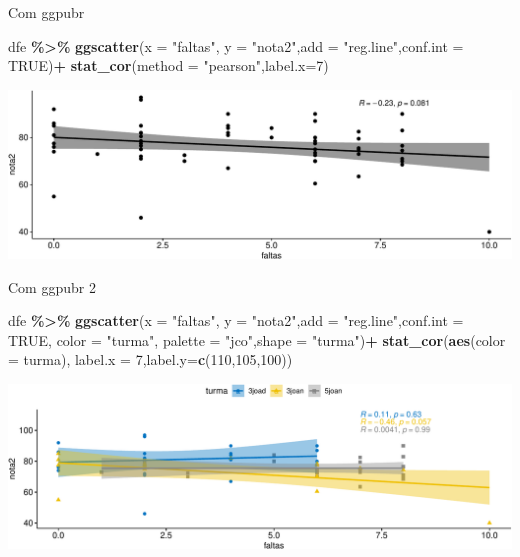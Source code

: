 \documentclass[
  9pt,
  ignorenonframetext,
  aspectratio=169]{beamer}
\newenvironment{Shaded}{\begin{snugshade}}{\end{snugshade}}
\newcommand{\DataTypeTok}[1]{\textcolor[rgb]{0.13,0.29,0.53}{#1}}
\newcommand{\DecValTok}[1]{\textcolor[rgb]{0.00,0.00,0.81}{#1}}
\newcommand{\KeywordTok}[1]{\textcolor[rgb]{0.13,0.29,0.53}{\textbf{#1}}}
\newcommand{\NormalTok}[1]{#1}
\newcommand{\OperatorTok}[1]{\textcolor[rgb]{0.81,0.36,0.00}{\textbf{#1}}}
\newcommand{\OtherTok}[1]{\textcolor[rgb]{0.56,0.35,0.01}{#1}}
\newcommand{\StringTok}[1]{\textcolor[rgb]{0.31,0.60,0.02}{#1}}
\begin{document}
\begin{frame}[fragile]{Com ggpubr}
\protect\hypertarget{com-ggpubr}{}
\begin{Shaded}
\begin{Highlighting}[]
\NormalTok{dfe }\OperatorTok{\%\textgreater{}\%}\StringTok{ }\KeywordTok{ggscatter}\NormalTok{(}\DataTypeTok{x =} \StringTok{"faltas"}\NormalTok{, }\DataTypeTok{y =} \StringTok{"nota2"}\NormalTok{,}\DataTypeTok{add =} \StringTok{"reg.line"}\NormalTok{,}\DataTypeTok{conf.int =} \OtherTok{TRUE}\NormalTok{)}\OperatorTok{+}
\StringTok{  }\KeywordTok{stat\_cor}\NormalTok{(}\DataTypeTok{method =} \StringTok{"pearson"}\NormalTok{,}\DataTypeTok{label.x=}\DecValTok{7}\NormalTok{)}
\end{Highlighting}
\end{Shaded}

\includegraphics{aula_11_files/figure-beamer/unnamed-chunk-33-1.pdf}
\end{frame}

\begin{frame}[fragile]{Com ggpubr 2}
\protect\hypertarget{com-ggpubr-2}{}
\begin{Shaded}
\begin{Highlighting}[]
\NormalTok{dfe }\OperatorTok{\%\textgreater{}\%}\StringTok{ }\KeywordTok{ggscatter}\NormalTok{(}\DataTypeTok{x =} \StringTok{"faltas"}\NormalTok{, }\DataTypeTok{y =} \StringTok{"nota2"}\NormalTok{,}\DataTypeTok{add =} \StringTok{"reg.line"}\NormalTok{,}\DataTypeTok{conf.int =} \OtherTok{TRUE}\NormalTok{,}
          \DataTypeTok{color =} \StringTok{"turma"}\NormalTok{, }\DataTypeTok{palette =} \StringTok{"jco"}\NormalTok{,}\DataTypeTok{shape =} \StringTok{"turma"}\NormalTok{)}\OperatorTok{+}
\StringTok{  }\KeywordTok{stat\_cor}\NormalTok{(}\KeywordTok{aes}\NormalTok{(}\DataTypeTok{color =}\NormalTok{ turma), }\DataTypeTok{label.x =} \DecValTok{7}\NormalTok{,}\DataTypeTok{label.y=}\KeywordTok{c}\NormalTok{(}\DecValTok{110}\NormalTok{,}\DecValTok{105}\NormalTok{,}\DecValTok{100}\NormalTok{))}
\end{Highlighting}
\end{Shaded}

\includegraphics{aula_11_files/figure-beamer/unnamed-chunk-34-1.pdf}
\end{frame}
\end{document}
